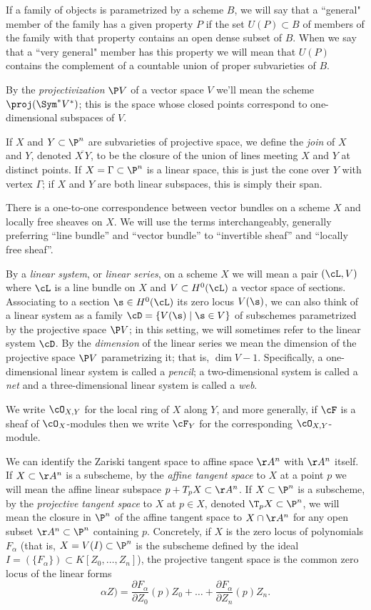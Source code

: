 If a family of objects is parametrized by a scheme $B$, we will say that a ``general" member of the family has a given property $P$ if the set $U(P) \subset B$ of members of the family with that property contains an open dense subset of $B$. When we say that a ``very general" member has this property  we will mean that $U(P)$ contains the complement of a countable union of proper subvarieties of $B$.


By the \emph{projectivization} $\P V$ of a vector space $V$ we'll mean the scheme $\proj(\Sym^* V^*)$; this is the space whose closed points correspond to one-dimensional subspaces of $V$.

If $X$ and $Y \subset \P^n$ are subvarieties of projective space, we define the \emph{join} of $X$ and $Y$, denoted $\overline{X\,Y}$, to be the closure of the union of lines meeting $X$ and $Y$ at distinct points. If $X = \Gamma \subset \P^n$ is a linear space, this is just the cone over $Y$ with vertex $\Gamma$; if $X$ and $Y$ are both linear subspaces, this is simply their span.

There is a one-to-one correspondence between vector bundles on a scheme $X$ and locally free sheaves on $X$. We will use the terms interchangeably, generally preferring ``line bundle'' and ``vector bundle'' to ``invertible sheaf'' and ``locally free sheaf''.

By a \emph{linear system}, or \emph{linear series}, on a scheme $X$ we will mean a pair $(\cL, V)$ where $\cL$ is a line bundle on $X$ and $V \subset H^0(\cL)$ a vector space of sections. Associating to a section $\s \in H^0(\cL)$ its zero locus $V(\s)$, we can also think of a linear system as a family $\cD = \{ V(\s) \mid \s \in V\}$ of subschemes parametrized by the projective space $\P V$; in this setting, we will sometimes refer to the linear system $\cD$. By the \emph{dimension} of the linear series we mean the dimension of the projective space $\P V$ parametrizing it; that is, $\dim V - 1$. Specifically, a one-dimensional linear system is called a \emph{pencil}; a two-dimensional system is called a \emph{net} and a three-dimensional linear system is called a \emph{web}.

We write $\cO_{X,Y}$
for the local ring of $X$ along $Y$, and more generally, if $\cF$ is a sheaf of
$\cO_{X}$-modules then we write $\cF_Y$ for the 
corresponding $\cO_{X,Y}$-module.

We can identify the Zariski tangent space to affine space $\AA^n$ with $\AA^n$ itself. If $X \subset \AA^n$ is a subscheme, by the \emph{affine tangent space} to $X$ at a point $p$ we will mean the affine linear subspace $p + T_pX \subset \AA^n$. If $X \subset \P^n$ is a subscheme, by the \emph{projective tangent space} to $X$ at $p \in X$, denoted $\T_pX \subset \P^n$, we will mean the closure in $\P^n$ of the affine tangent space to $X \cap \AA^n$ for any open subset $\AA^n \subset \P^n$ containing $p$. Concretely, if $X$ is the zero locus of polynomials $F_\alpha$ (that is, $X = V(I) \subset \P^n$ is the subscheme defined by the ideal $I = (\{F_\alpha\}) \subset K[Z_0,\dots,Z_n]$), the projective tangent space is the common zero locus of the linear forms
$$
\alpha Z) = \frac{\partial F_\alpha}{\partial Z_0}(p)Z_0 + \dots + \frac{\partial F_\alpha}{\partial Z_n}(p)Z_n.
$$

